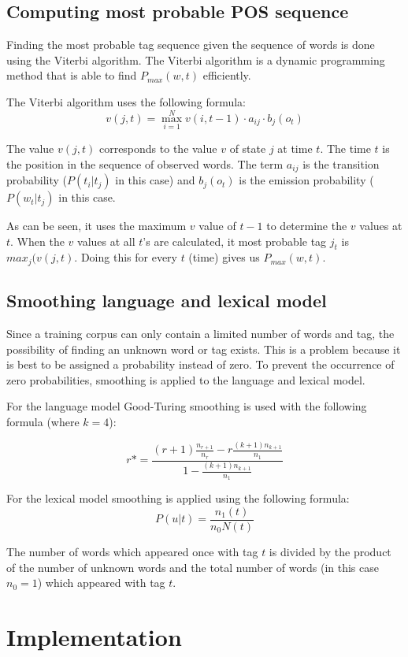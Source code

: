 \documentclass[titlepage,a4paper, 10pt]{article}
\begin{document}
\subsection{Computing most probable POS sequence}
Finding the most probable tag sequence given the sequence of words is done using the Viterbi algorithm. The Viterbi algorithm is a dynamic programming method that is able to find $P_{max}(w,t)$ efficiently.

The Viterbi algorithm uses the following formula:
$$v(j,t) = \max \limits^N_{i=1} v(i,t-1)\cdot a_{ij}\cdot b_j(o_t)$$

The value $v(j,t)$ corresponds to the value $v$ of state $j$ at time $t$. 
The time $t$ is the position in the sequence of observed words.
The term $a_{ij}$ is the transition probability ($P(t_i|t_j)$ in this case) and $b_j(o_t)$ is the emission probability ($P(w_t | t_j)$ in this case. 

As can be seen, it uses the maximum $v$ value of $t-1$ to determine the $v$ values at $t$. When the $v$ values at all $t$'s are calculated, it most probable tag $j_t$ is $max_j(v(j,t)$. Doing this for every $t$ (time) gives us $P_{max}(w,t)$.

\subsection{Smoothing language and lexical model}

Since a training corpus can only contain a limited number of words and tag, the possibility of finding an unknown word or tag exists. 
This is a problem because it is best to be assigned a probability instead of zero.
To prevent the occurrence of zero probabilities, smoothing is applied to the language and lexical model.

\noindent For the language model Good-Turing smoothing is used with the following formula (where $k = 4$):

$$r* = \frac{(r+1)\frac{n_{r+1}}{n_r}-r\frac{(k+1)n_{k+1}}{n_1}}{1-\frac{(k+1)n_{k+1}}{n_1}}$$

\noindent For the lexical model smoothing is applied using the following formula:
$$P(u|t)=\frac{n_1(t)}{n_0N(t)}$$

The number of words which appeared once with tag $t$ is divided by the product of the number of unknown words and the total number of words (in this case $n_0 = 1$) which appeared with tag $t$.

\section{Implementation}
\end{document}
